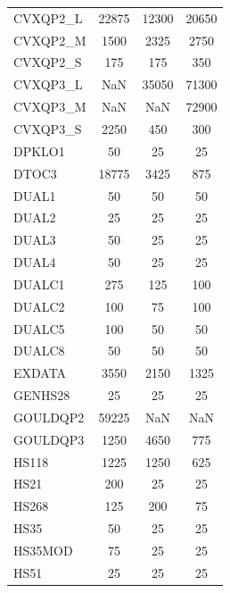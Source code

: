 \begin{longtable}{lccc}
CVXQP2\_L &         22875 &         12300 &         20650 \\
CVXQP2\_M &          1500 &          2325 &          2750 \\
CVXQP2\_S &           175 &           175 &           350 \\
CVXQP3\_L &           NaN &         35050 &         71300 \\
CVXQP3\_M &           NaN &           NaN &         72900 \\
CVXQP3\_S &          2250 &           450 &           300 \\
DPKLO1   &            50 &            25 &            25 \\
DTOC3    &         18775 &          3425 &           875 \\
DUAL1    &            50 &            50 &            50 \\
DUAL2    &            25 &            25 &            25 \\
DUAL3    &            50 &            25 &            25 \\
DUAL4    &            50 &            25 &            25 \\
DUALC1   &           275 &           125 &           100 \\
DUALC2   &           100 &            75 &           100 \\
DUALC5   &           100 &            50 &            50 \\
DUALC8   &            50 &            50 &            50 \\
EXDATA   &          3550 &          2150 &          1325 \\
GENHS28  &            25 &            25 &            25 \\
GOULDQP2 &         59225 &           NaN &           NaN \\
GOULDQP3 &          1250 &          4650 &           775 \\
HS118    &          1225 &          1250 &           625 \\
HS21     &           200 &            25 &            25 \\
HS268    &           125 &           200 &            75 \\
HS35     &            50 &            25 &            25 \\
HS35MOD  &            75 &            25 &            25 \\
HS51     &            25 &            25 &            25 \\

\end{longtable}
